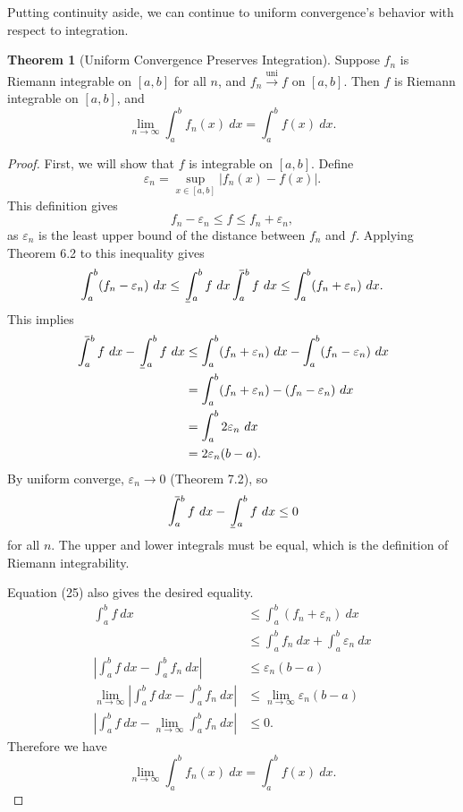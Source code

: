 \documentclass{article}
\def\upint{\mathchoice%
	{\mkern13mu\overline{\vphantom{\intop}\mkern7mu}\mkern-20mu}%
	{\mkern7mu\overline{\vphantom{\intop}\mkern7mu}\mkern-14mu}%
	{\mkern7mu\overline{\vphantom{\intop}\mkern7mu}\mkern-14mu}%
	{\mkern7mu\overline{\vphantom{\intop}\mkern7mu}\mkern-14mu}%
	\int}
\def\lowint{\mkern3mu\underline{\vphantom{\intop}\mkern7mu}\mkern-10mu\int}
\newcommand{\uni}{\overset{\text{uni}}{\to}}
\theoremstyle{definition}
\newtheorem{theorem}{Theorem}[section]
\begin{document}
Putting continuity aside, we can continue to uniform convergence's behavior with respect to integration. 
\begin{theorem}[Uniform Convergence Preserves Integration]
Suppose $ f_n $ is Riemann integrable on $ [a,b] $ for all $ n $, and $ f_n\uni f $ on $ [a,b] $. Then $ f $ is Riemann integrable on $ [a,b] $, and $$ \lim\limits_{n\to\infty}\int_{a}^{b}f_n(x)\ dx=\int_a^bf(x)\ dx.$$
\end{theorem}
\begin{proof}
	First, we will show that $ f $ is integrable on $ [a,b] $. Define $$ \varepsilon_n=\sup_{x\in [a,b]}|f_n(x)-f(x)|.$$ This definition gives $$ f_n-\varepsilon_n\le f\le f_n+\varepsilon_n, $$ as $ \varepsilon_n $ is the least upper bound of the distance between $ f_n $ and $ f $. Applying Theorem 6.2 to this inequality gives 
	\begin{align}
		\int_{a}^{b}(f_n-\varepsilon_n)\ dx\le\lowint_{a}^b f \ dx\upint_{a}^b f \ dx\le \int_{a}^{b}(f_n+\varepsilon_n)\ dx.
	\end{align}
This implies 
\begin{align*}
		\upint_{a}^b f \ dx - \lowint_{a}^b f \ dx&\le  \int_{a}^{b}(f_n+\varepsilon_n)\ dx - \int_{a}^{b}(f_n-\varepsilon_n)\ dx\\
		&= \int_{a}^{b}(f_n+\varepsilon_n) - (f_n-\varepsilon_n) \ dx\\&=\int_{a}^{b}2\varepsilon_n \ dx\\ &= 2\varepsilon_n (b-a).
\end{align*}
By uniform converge, $ \varepsilon_n\to 0 $ (Theorem 7.2), so $$	\upint_{a}^b f \ dx - \lowint_{a}^b f \ dx\le 0 $$ for all $ n $. The upper and lower integrals must be equal, which is the definition of Riemann integrability. 

Equation (25) also gives the desired equality. 
\begin{align*}
	\int_{a}^b f \ dx&\le \int_{a}^{b}(f_n+\varepsilon_n)\ dx\\
	&\le \int_{a}^{b}f_n\ dx + \int_{a}^{b}\varepsilon_n\ dx\\
	\left\lvert\int_{a}^{b}f\ dx -\int_{a}^{b}f_n\ dx\right\rvert&\le \varepsilon_n(b-a)\\
	\lim_{n\to\infty}\left\lvert\int_{a}^{b}f\ dx -\int_{a}^{b}f_n\ dx\right\rvert&\le \lim_{n\to\infty}\varepsilon_n(b-a)\\
	\left\lvert\int_{a}^{b}f\ dx -\lim_{n\to\infty}\int_{a}^{b}f_n\ dx\right\rvert&\le0.
\end{align*}
Therefore we have $$ \lim\limits_{n\to\infty}\int_{a}^{b}f_n(x)\ dx=\int_a^bf(x)\ dx.$$
\end{proof}
\end{document}
